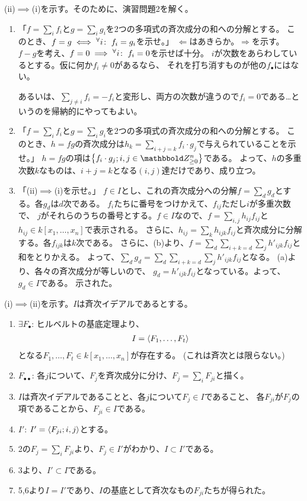 \begin{myproof}
  (ii)$\implies$(i)を示す。そのために、演習問題2を解く。
  \begin{enumerate}[label=(演習2-\alph*)]
    \item 「$f=\sum_i f_i$と$g=\sum_i g_i$を2つの多項式の斉次成分の和への分解とする。
    このとき、$f=g \iff {}^{\forall}{i}\mathrm{\colon\;} f_i = g_i$を示せ。」
    $\Leftarrow$はあきらか。$\Rightarrow$を示す。
    $f-g$を考え、$f=0 \implies {}^{\forall}{i}\mathrm{\colon\;}f_i = 0$を示せば十分。
    $i$が次数をあらわしているとする。仮に何か$f_i \neq 0$があるなら、
    それを打ち消すものが他の$f_\bullet$にはない。

    あるいは、$\sum_{j\neq i}f_i = -f_i$と変形し、両方の次数が違うので$f_i=0$である…というのを帰納的にやってもよい。
    \item
    「$f=\sum_i f_i$と$g=\sum_i g_i$を2つの多項式の斉次成分の和への分解とする。
    このとき、$h=fg$の斉次成分は$h_k = \sum_{i+j = k}f_i\cdot g_j$で与えられていることを示せ。」
    $h=fg$の項は$\set{f_i\cdot g_j; i,j\in \Zge^n}$である。
    よって、$h$の多重次数$k$なものは、$i+j=k$となる$(i,j)$達だけであり、成り立つ。
    \item
    「(ii)$\implies$(i)を示せ。」
    $f\in I$とし、これの斉次成分への分解$f=\sum_{d}g_d$とする。各$g_d$は$d$次である。
    $f_i$たちに番号をつけかえて、$f_{ij}$ただし$i$が多重次数で、
    $j$がそれらのうちの番号とする。$f\in I$なので、$f=\sum_{i,j} h_{ij}f_{ij}$と$h_{ij}\in k[x_1,\dots,x_n]$で表示される。
    さらに、$h_{ij}=\sum_{k} h_{ijk}f_{ij}$と斉次成分に分解する。各$f_{ijk}$は$k$次である。
    さらに、(b)より、$f=\sum_d \sum_{i+k=d} \sum_j h'_{ijk}f_{ij}$と和をとりかえる。
    よって、$\sum_d g_d = \sum_{d}\sum_{i+k=d} \sum_j h'_{ijk} f_{ij}$となる。
    (a)より、各々の斉次成分が等しいので、
    $g_d = h'_{ijk}f_{ij}$となっている。よって、$g_d \in I$である。
    示された。
  \end{enumerate}

  (i)$\implies$(ii)を示す。$I$は斉次イデアルであるとする。
  \begin{enumerate}
    \item $\exists F_\bullet$:
    ヒルベルトの基底定理より、
    \begin{align}
      I=\left\langle F_1,\dots,F_t \right\rangle
    \end{align}
    となる$F_1,\dots,F_t \in k[x_1,\dots,x_n]$が存在する。
    (これは斉次とは限らない。)
    \item
    $F_{\bullet \bullet}$:
    各$j$について、$F_j$を斉次成分に分け、$F_j = \sum_{i}F_{ji}$と描く。
    \item
    $I$は斉次イデアルであることと、各$j$について$F_j \in I$であること、
    各$F_{ji}$が$F_j$の項であることから、$F_{ji} \in I$である。
    \item $I'$:
    $I'=\left\langle F_{ji}; i,j \right\rangle$とする。
    \item
    2の$F_j = \sum_i F_{ji}$より、$F_j \in I'$がわかり、$I \subset I'$である。
    \item 3より、$I'\subset I$である。
    \item 5,6より$I=I'$であり、$I$の基底として斉次なもの$F_{ji}$たちが得られた。
  \end{enumerate}


\end{myproof}
